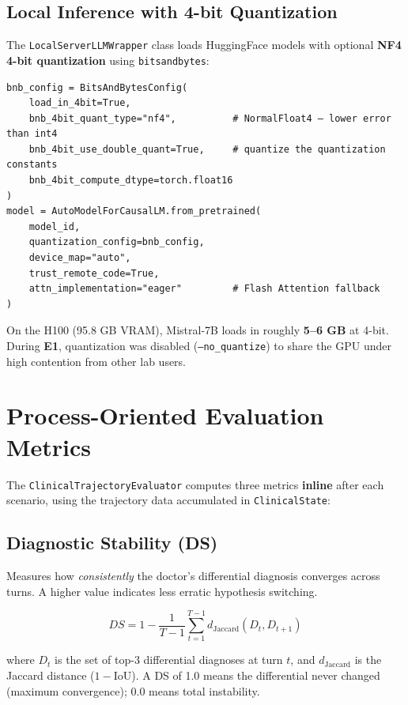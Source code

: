 \documentclass[12pt, a4paper]{article}
\begin{document}
\subsection{Local Inference with 4-bit Quantization}

The \texttt{LocalServerLLMWrapper} class loads HuggingFace models with optional \textbf{NF4 4-bit quantization} using \texttt{bitsandbytes}:

\begin{lstlisting}[style=pystyle]
bnb_config = BitsAndBytesConfig(
    load_in_4bit=True,
    bnb_4bit_quant_type="nf4",          # NormalFloat4 — lower error than int4
    bnb_4bit_use_double_quant=True,     # quantize the quantization constants
    bnb_4bit_compute_dtype=torch.float16
)
model = AutoModelForCausalLM.from_pretrained(
    model_id,
    quantization_config=bnb_config,
    device_map="auto",
    trust_remote_code=True,
    attn_implementation="eager"         # Flash Attention fallback
)
\end{lstlisting}

\noindent On the H100 (95.8 GB VRAM), Mistral-7B loads in roughly \textbf{5--6 GB} at 4-bit. During \textbf{E1}, quantization was disabled (\texttt{--no\_quantize}) to share the GPU under high contention from other lab users.

\section{Process-Oriented Evaluation Metrics}

The \texttt{ClinicalTrajectoryEvaluator} computes three metrics \textbf{inline} after each scenario, using the trajectory data accumulated in \texttt{ClinicalState}:

\subsection{Diagnostic Stability (DS)}

Measures how \textit{consistently} the doctor's differential diagnosis converges across turns. A higher value indicates less erratic hypothesis switching.

\[
DS = 1 - \frac{1}{T-1} \sum_{t=1}^{T-1} d_{\text{Jaccard}}(D_t, D_{t+1})
\]

where $D_t$ is the set of top-3 differential diagnoses at turn $t$, and $d_{\text{Jaccard}}$ is the Jaccard distance ($1 - \text{IoU}$). A DS of 1.0 means the differential never changed (maximum convergence); 0.0 means total instability.
\end{document}
